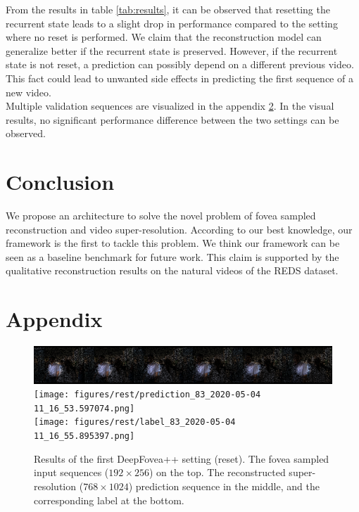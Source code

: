 \documentclass[10pt,twocolumn,letterpaper]{article}
\begin{document}
From the results in table \ref{tab:results}, it can be observed that resetting the recurrent state leads to a slight drop in performance compared to the setting where no reset is performed. We claim that the reconstruction model can generalize better if the recurrent state is preserved. However, if the recurrent state is not reset, a prediction can possibly depend on a different previous video. This fact could lead to unwanted side effects in predicting the first sequence of a new video.\\
Multiple validation sequences are visualized in the appendix \ref{sec:appendix}. In the visual results, no significant performance difference between the two settings can be observed. 

\section{Conclusion} \label{sec:conclusion}
We propose an architecture to solve the novel problem of fovea sampled reconstruction and video super-resolution. According to our best knowledge, our framework is the first to tackle this problem. We think our framework can be seen as a baseline benchmark for future work. This claim is supported by the qualitative reconstruction results on the natural videos of the REDS dataset.

{\small
    
    
}

\section{Appendix} \label{sec:appendix}

\begin{figure}[htbp!]
    \centering
    \includegraphics[width=\columnwidth]{figures/rest/input_83_2020-05-04 11_16_57.840082.png}\\\vspace{-0.1cm}
    \texttt{[image: figures/rest/prediction\_83\_2020-05-04 11\_16\_53.597074.png]}\\\vspace{-0.1cm}
    \texttt{[image: figures/rest/label\_83\_2020-05-04 11\_16\_55.895397.png]}\\
    \caption{Results of the first DeepFovea++ setting (reset). The fovea sampled input sequences ($192 \times 256$) on the top. The reconstructed super-resolution ($768 \times 1024$) prediction sequence in the middle, and the corresponding label at the bottom.}
    \label{fig:restresults1}
\end{figure}
\end{document}
